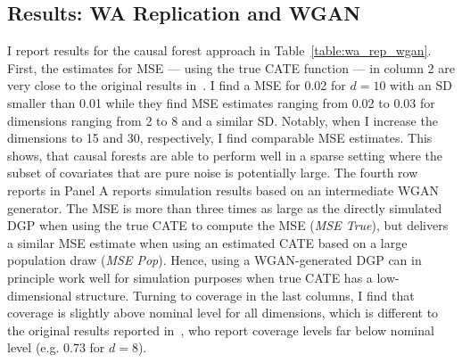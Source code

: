\documentclass[11pt, a4paper, leqno]{article}
\begin{document}
\subsection{Results: WA Replication and WGAN}
I report results for the causal forest approach in Table~\ref*{table:wa_rep_wgan}.
First, the estimates for MSE --- using the true CATE function --- in column 2 are very close to the original results in~\citet{wager2018estimation}.
I find a MSE for 0.02 for $d=10$ with an SD smaller than 0.01 while they find MSE estimates ranging from 0.02 to 0.03 for dimensions ranging from 2 to 8 and a similar SD\@.
Notably, when I increase the dimensions to 15 and 30, respectively, I find comparable MSE estimates.
This shows, that causal forests are able to perform well in a sparse setting where the subset of covariates that are pure noise is potentially large.
The fourth row reports in Panel A reports simulation results based on an intermediate WGAN generator.
The MSE is more than three times as large as the directly simulated DGP when using the true CATE to compute the MSE (\textit{MSE True}), but delivers a similar MSE estimate when using an estimated CATE based on a large population draw (\textit{MSE Pop}).
Hence, using a WGAN-generated DGP can in principle work well for simulation purposes when true CATE has a low-dimensional structure.
Turning to coverage in the last columns, I find that coverage is slightly above nominal level for all dimensions, which is different to the original results reported in~\citet{wager2018estimation}, who report coverage levels far below nominal level (e.g. 0.73 for $d=8$).
\end{document}
